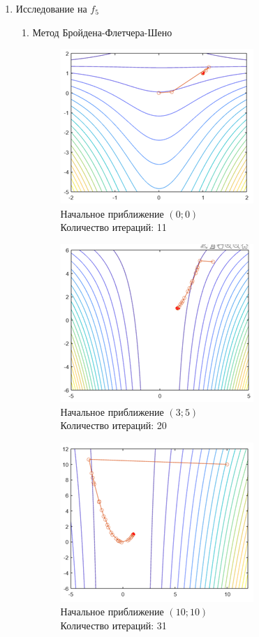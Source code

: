 \documentclass[12pt]{article}
\begin{document}
\begin{enumerate}
	\item Исследование на $f_5$
	\begin{enumerate}

	\item Метод Бройдена-Флетчера-Шено
	\begin{figure}[H]
	\begin{minipage}{.5\textwidth}
    	\centering
    	\includegraphics[]{img/f5_1_1.png}
    	\\ Начальное приближение $\left( 0; 0 \right)$
    	\\ Количество итераций: 11
	\end{minipage}
	\begin{minipage}{.5\textwidth}
    	\centering
    	\includegraphics[]{img/f5_1_2.png}
    	\\ Начальное приближение $\left( 3; 5 \right)$
    	\\ Количество итераций: 20
	\end{minipage}
    \end{figure}

	\begin{figure}[H]
    	\centering
    	\includegraphics[]{img/f5_1_3.png}
    	\\ Начальное приближение $\left( 10; 10 \right)$
    	\\ Количество итераций: 31
    \end{figure}


\end{enumerate}
\end{enumerate}
\end{document}
